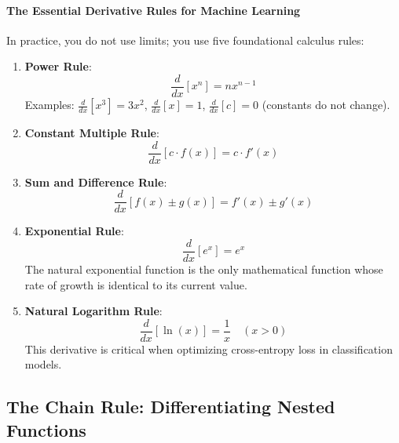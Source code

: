 \paragraph{The Essential Derivative Rules for Machine Learning}
In practice, you do not use limits; you use five foundational calculus rules:
\begin{enumerate}
    \item \textbf{Power Rule}:
    \begin{equation}
    \frac{d}{dx}[x^n] = n x^{n-1}\label{eq:power_rule}
    \end{equation}
    Examples: $\frac{d}{dx}[x^3] = 3x^2$, \quad $\frac{d}{dx}[x] = 1$, \quad $\frac{d}{dx}[c] = 0$ (constants do not change).

    \item \textbf{Constant Multiple Rule}:
    \begin{equation}
    \frac{d}{dx}[c \cdot f(x)] = c \cdot f'(x)\label{eq:const_multiple}
    \end{equation}

    \item \textbf{Sum and Difference Rule}:
    \begin{equation}
    \frac{d}{dx}[f(x) \pm g(x)] = f'(x) \pm g'(x)\label{eq:sum_rule}
    \end{equation}

    \item \textbf{Exponential Rule}:
    \begin{equation}
    \frac{d}{dx}[e^x] = e^x\label{eq:exp_rule}
    \end{equation}
    The natural exponential function is the only mathematical function whose rate of growth is identical to its current value.

    \item \textbf{Natural Logarithm Rule}:
    \begin{equation}
    \frac{d}{dx}[\ln(x)] = \frac{1}{x} \quad (x > 0)\label{eq:log_rule}
    \end{equation}
    This derivative is critical when optimizing cross-entropy loss in classification models.
\end{enumerate}

\subsection{The Chain Rule: Differentiating Nested Functions}

